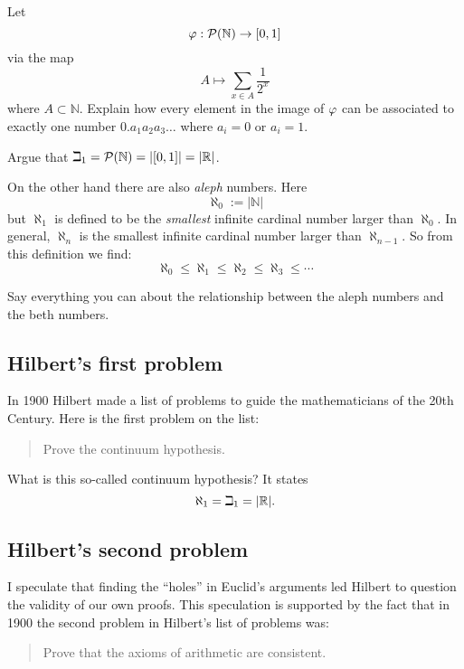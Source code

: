 \documentclass[nooutcomes]{ximera}
\begin{document}
\begin{question}
Let 
\[
\varphi: \mathcal{P}(\mathbb{N}) \to [0,1]
\]
via the map 
\[
A \mapsto \sum_{x\in A} \frac{1}{2^x}
\]
where $A\subset \mathbb{N}$. Explain how every element in the image of $\varphi$
can be associated to exactly one number $0.a_1a_2a_3\dots$ where $a_i=
0$ or $a_i=1$.
\end{question}

\begin{question}
Argue that $\beth_1 = \mathcal{P}(\mathbb{N})= |[0,1]| = |\mathbb{R}|$.
\end{question}


On the other hand there are also \textit{aleph} numbers. Here
\[
\aleph_0 := |\mathbb{N}|
\]
but $\aleph_1$ is defined to be the \textit{smallest} infinite cardinal
number larger than $\aleph_0$. In general, $\aleph_n$ is the smallest
infinite cardinal number larger than $\aleph_{n-1}$. So from this
definition we find:
\[
\aleph_0 \le \aleph_1 \le \aleph_2 \le \aleph_3 \le \cdots
\]

\begin{question}
Say everything you can about the relationship between the aleph
numbers and the beth numbers.
\end{question}

\subsection*{Hilbert's first problem}


In 1900 Hilbert made a list of problems to guide the mathematicians
of the 20th Century. Here is the first problem on the list:

\begin{quote}
Prove the continuum hypothesis.
\end{quote}

What is this so-called continuum hypothesis? It states
\[
\aleph_1 = \beth_1 = |\mathbb{R}|.
\]

\subsection*{Hilbert's second problem}

I speculate that finding the ``holes'' in Euclid's arguments led
Hilbert to question the validity of our own proofs. This speculation
is supported by the fact that in 1900 the second problem in Hilbert's
list of problems was:
\begin{quote}
Prove that the axioms of arithmetic are consistent.
\end{quote}
\end{document}
